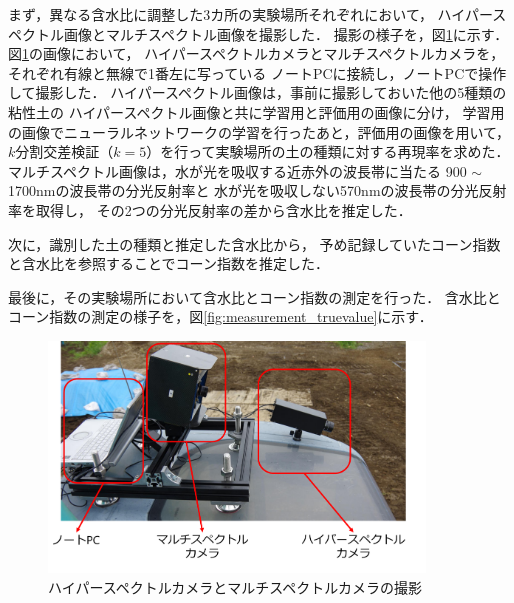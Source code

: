 まず，異なる含水比に調整した3カ所の実験場所それぞれにおいて，
ハイパースペクトル画像とマルチスペクトル画像を撮影した．
撮影の様子を，図\ref{fig:spectral_camera_shooting}に示す．
図\ref{fig:spectral_camera_shooting}の画像において，
ハイパースペクトルカメラとマルチスペクトルカメラを，それぞれ有線と無線で1番左に写っている
ノートPCに接続し，ノートPCで操作して撮影した．
ハイパースペクトル画像は，事前に撮影しておいた他の5種類の粘性土の
ハイパースペクトル画像と共に学習用と評価用の画像に分け，
学習用の画像でニューラルネットワークの学習を行ったあと，評価用の画像を用いて，
$k$分割交差検証（$k=5$）を行って実験場所の土の種類に対する再現率を求めた．
マルチスペクトル画像は，水が光を吸収する近赤外の波長帯に当たる
900 $\sim$ 1700nmの波長帯の分光反射率と
水が光を吸収しない570nmの波長帯の分光反射率を取得し，
その2つの分光反射率の差から含水比を推定した．


次に，識別した土の種類と推定した含水比から，
予め記録していたコーン指数と含水比を参照することでコーン指数を推定した．

最後に，その実験場所において含水比とコーン指数の測定を行った．
含水比とコーン指数の測定の様子を，図\ref{fig:measurement_truevalue}に示す．

\begin{figure}[p]
      \begin{center}
            \includegraphics[width=10cm]{./Ch5_ConeIndexEstimation/Fig/spectral_camera_shooting_compressed.pdf}
            \caption{ハイパースペクトルカメラとマルチスペクトルカメラの撮影}
            \label{fig:spectral_camera_shooting}
      \end{center}
\end{figure}


